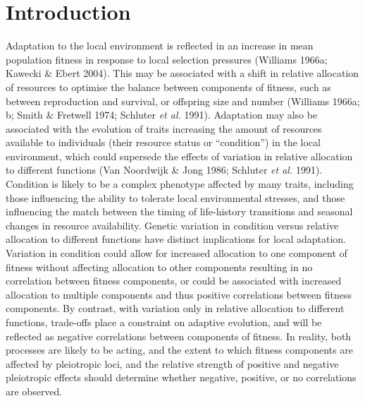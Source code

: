 \documentclass[]{article}
\begin{document}
\hypertarget{introduction}{%
\section{Introduction}\label{introduction}}

Adaptation to the local environment is reflected in an increase in mean population fitness in response to local selection pressures (Williams 1966a; Kawecki \& Ebert 2004). This may be associated with a shift in relative allocation of resources to optimise the balance between components of fitness, such as between reproduction and survival, or offspring size and number (Williams 1966a; b; Smith \& Fretwell 1974; Schluter \emph{et al.} 1991). Adaptation may also be associated with the evolution of traits increasing the amount of resources available to individuals (their resource status or ``condition'') in the local environment, which could supersede the effects of variation in relative allocation to different functions (Van Noordwijk \& Jong 1986; Schluter \emph{et al.} 1991). Condition is likely to be a complex phenotype affected by many traits, including those influencing the ability to tolerate local environmental stresses, and those influencing the match between the timing of life-history transitions and seasonal changes in resource availability. Genetic variation in condition versus relative allocation to different functions have distinct implications for local adaptation. Variation in condition could allow for increased allocation to one component of fitness without affecting allocation to other components resulting in no correlation between fitness components, or could be associated with increased allocation to multiple components and thus positive correlations between fitness components. By contrast, with variation only in relative allocation to different functions, trade-offs place a constraint on adaptive evolution, and will be reflected as negative correlations between components of fitness. In reality, both processes are likely to be acting, and the extent to which fitness components are affected by pleiotropic loci, and the relative strength of positive and negative pleiotropic effects should determine whether negative, positive, or no correlations are observed.
\end{document}
